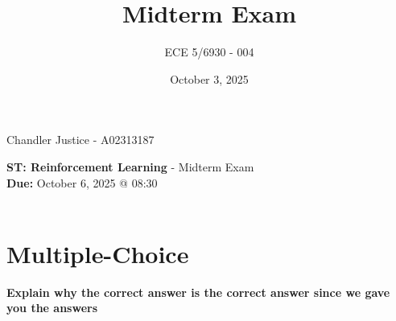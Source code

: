 \documentclass{exam}
\title{Midterm Exam}
\author{ECE 5/6930 - 004}
\date{October 3, 2025}
\begin{document}
\begin{flushright}
Chandler Justice - A02313187
\end{flushright}
\textbf{ST: Reinforcement Learning} - Midterm Exam\\
\textbf{Due:} October 6, 2025 @ 08:30\\

\noindent \underline{\hspace{3in}}\\


\section{Multiple-Choice}

\textbf{Explain why the correct answer is the correct answer since we gave you the answers}
\end{document}
